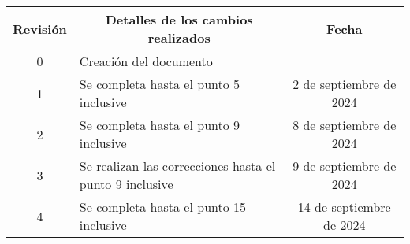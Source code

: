 \begin{table}[ht]
	\label{tab:registro}
	\centering
	\begin{tabularx}{\linewidth}{@{}|c|X|c|@{}}
		\hline
		\rowcolor[HTML]{C0C0C0}
		Revisión & \multicolumn{1}{c|}{\cellcolor[HTML]{C0C0C0}Detalles de los cambios realizados} & Fecha                        \\ \hline
		0        & Creación del documento                                                          & \fechaInicioName             \\ \hline
		1        & Se completa hasta el punto 5 inclusive                                          & {2} de {septiembre} de 2024  \\ \hline
		2        & Se completa hasta el punto 9 inclusive                                          & {8} de {septiembre} de 2024  \\ \hline
		3        & Se realizan las correcciones hasta el punto 9 inclusive                         & {9} de {septiembre} de 2024  \\ \hline
		4        & Se completa hasta el punto 15 inclusive                                         & {14} de {septiembre} de 2024 \\ \hline

	\end{tabularx}
\end{table}